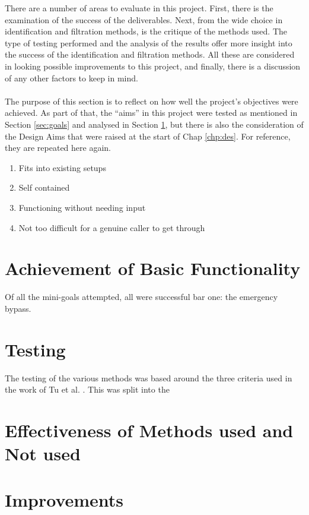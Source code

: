 \documentclass[main.tex]{subfiles}
\begin{document}
There are a number of areas to evaluate in this project. First, there is the examination of the success of the deliverables. Next, from the wide choice in identification and filtration methods, is the critique of the methods used. The type of testing performed and the analysis of the results offer more insight into the success of the identification and filtration methods. All these are considered in looking possible improvements to this project, and finally, there is a discussion of any other factors to keep in mind.
\\\\
The purpose of this section is to reflect on how well the project's objectives were achieved. As part of that, the ``aims'' in this project were tested as mentioned in Section \ref{sec:goals} and analysed in Section \ref{sec:basic-eval}, but there is also the consideration of the Design Aims that were raised at the start of Chap \ref{chp:des}. For reference, they are repeated here again.

\begin{enumerate}
	\item Fits into existing setups
	\item Self contained
	\item Functioning without needing input
	\item Not too difficult for a genuine caller to get through
\end{enumerate}

\section{Achievement of Basic Functionality}\label{sec:basic-eval}

Of all the mini-goals attempted, all were successful bar one: the emergency bypass.


\section{Testing}
The testing of the various methods was based around the three criteria used in the work of Tu et al. \cite{cisco}. This was split into the

\section{Effectiveness of Methods used and Not used}


\section{Improvements}
\end{document}
